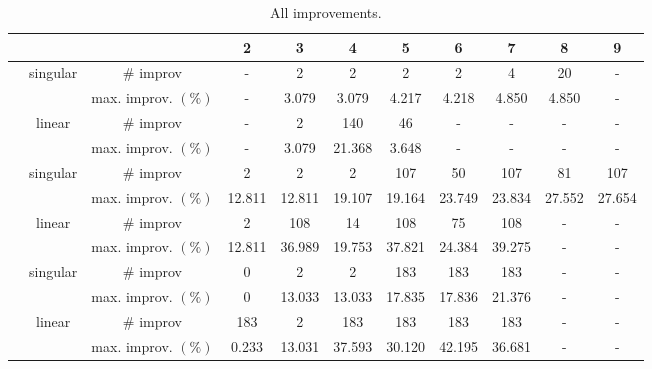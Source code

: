 \begin{table}[t]
	\begin{center}
		\begin{tabular}{|c|c|c|c|c|c|c|c|c|c|c|}
			\hline
			 &  &  & 2 & 3 & 4 & 5 & 6 & 7 & 8 & 9 \\
			\hline
			\IPMAPIns & singular & \# improv & - & 2 & 2 & 2 & 2 & 4 & 20 & - \\
			\hline
			 &  & max. improv. $(\%)$ & - & 3.079 & 3.079 & 4.217 & 4.218 & 4.850 & 4.850 & - \\
			\hline
			\IPMAPIns & linear & \# improv & - & 2 & 140 & 46 & - & - & - & - \\
			\hline
			 &  & max. improv. $(\%)$ & - & 3.079 & 21.368 & 3.648 & - & - & - & - \\
			\hline
			\ResetIns & singular & \# improv & 2 & 2 & 2 & 107 & 50 & 107 & 81 & 107 \\
			\hline
			 &  & max. improv. $(\%)$ & 12.811 & 12.811 & 19.107 & 19.164 & 23.749 & 23.834 & 27.552 & 27.654 \\
			\hline
			\ResetIns & linear & \# improv & 2 & 108 & 14 & 108 & 75 & 108 & - & - \\
			\hline
			 &  & max. improv. $(\%)$ & 12.811 & 36.989 & 19.753 & 37.821 & 24.384 & 39.275 & - & - \\
			\hline
			\LPhaseIns & singular & \# improv & 0 & 2 & 2 & 183 & 183 & 183 & - & - \\
			\hline
			 &  & max. improv. $(\%)$ & 0 & 13.033 & 13.033 & 17.835 & 17.836 & 21.376 & - & - \\
			\hline
			\LPhaseIns & linear & \# improv & 183 & 2 & 183 & 183 & 183 & 183 & - & - \\
			\hline
			 &  & max. improv. $(\%)$ & 0.233 & 13.031 & 37.593 & 30.120 & 42.195 & 36.681 & - & - \\
			\hline
		\end{tabular}
	\end{center}
	\caption{All improvements.}
	\label{tab:all_improv}
\end{table}